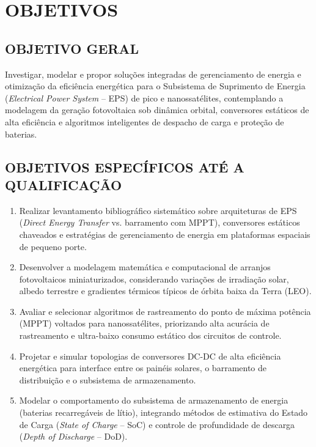 \newpage
\section{OBJETIVOS}

\subsection{OBJETIVO GERAL}
Investigar, modelar e propor soluções integradas de gerenciamento de energia e otimização da eficiência energética para o Subsistema de Suprimento de Energia (\textit{Electrical Power System} -- EPS) de pico e nanossatélites, contemplando a modelagem da geração fotovoltaica sob dinâmica orbital, conversores estáticos de alta eficiência e algoritmos inteligentes de despacho de carga e proteção de baterias.

\subsection{OBJETIVOS ESPECÍFICOS ATÉ A QUALIFICAÇÃO}
\begin{enumerate}[label=\arabic*.]
    \item Realizar levantamento bibliográfico sistemático sobre arquiteturas de EPS (\textit{Direct Energy Transfer} vs. barramento com MPPT), conversores estáticos chaveados e estratégias de gerenciamento de energia em plataformas espaciais de pequeno porte.
    \item Desenvolver a modelagem matemática e computacional de arranjos fotovoltaicos miniaturizados, considerando variações de irradiação solar, albedo terrestre e gradientes térmicos típicos de órbita baixa da Terra (LEO).
    \item Avaliar e selecionar algoritmos de rastreamento do ponto de máxima potência (MPPT) voltados para nanossatélites, priorizando alta acurácia de rastreamento e ultra-baixo consumo estático dos circuitos de controle.
    \item Projetar e simular topologias de conversores DC-DC de alta eficiência energética para interface entre os painéis solares, o barramento de distribuição e o subsistema de armazenamento.
    \item Modelar o comportamento do subsistema de armazenamento de energia (baterias recarregáveis de lítio), integrando métodos de estimativa do Estado de Carga (\textit{State of Charge} -- SoC) e controle de profundidade de descarga (\textit{Depth of Discharge} -- DoD).
\end{enumerate}

